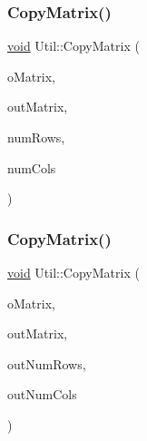 \mbox{\label{class_l_i_b___l_a_1_1_util_a17b52cf4d00a1455c24fc13422281fdd}} 
\subsubsection{\texorpdfstring{Copy\+Matrix()}{CopyMatrix()}\hspace{0.1cm}{\footnotesize\ttfamily [1/3]}}
{\footnotesize\ttfamily \hyperlink{lp__lib_8h_ac7828c7b2b31d2e11af17bdb6289c5d9}{void} Util\+::\+Copy\+Matrix (\begin{DoxyParamCaption}\item[{Double\+Matrix \&}]{o\+Matrix,  }\item[{double $\ast$$\ast$\&}]{out\+Matrix,  }\item[{\hyperlink{lp__lib_8h_adeb9ec6400320e4923ac9d836d509ddb}{int} \&}]{num\+Rows,  }\item[{\hyperlink{lp__lib_8h_adeb9ec6400320e4923ac9d836d509ddb}{int} \&}]{num\+Cols }\end{DoxyParamCaption})\hspace{0.3cm}{\ttfamily [static]}}

\mbox{\label{class_l_i_b___l_a_1_1_util_a559d7e76786d50b6394754c296482028}} 
\subsubsection{\texorpdfstring{Copy\+Matrix()}{CopyMatrix()}\hspace{0.1cm}{\footnotesize\ttfamily [2/3]}}
{\footnotesize\ttfamily \hyperlink{lp__lib_8h_ac7828c7b2b31d2e11af17bdb6289c5d9}{void} Util\+::\+Copy\+Matrix (\begin{DoxyParamCaption}\item[{Int\+Matrix \&}]{o\+Matrix,  }\item[{\hyperlink{lp__lib_8h_adeb9ec6400320e4923ac9d836d509ddb}{int} $\ast$$\ast$\&}]{out\+Matrix,  }\item[{\hyperlink{lp__lib_8h_adeb9ec6400320e4923ac9d836d509ddb}{int} \&}]{out\+Num\+Rows,  }\item[{\hyperlink{lp__lib_8h_adeb9ec6400320e4923ac9d836d509ddb}{int} \&}]{out\+Num\+Cols }\end{DoxyParamCaption})\hspace{0.3cm}{\ttfamily [static]}}

